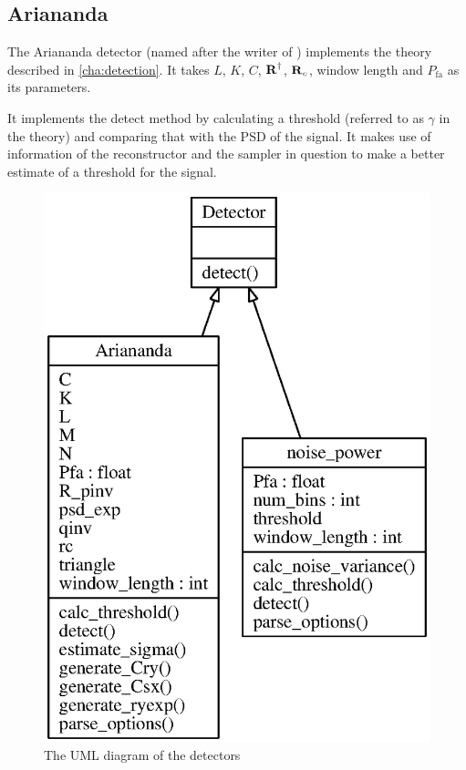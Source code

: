\documentclass[a4paper, openany, oneside]{memoir}
\begin{document}
\subsection{Ariananda}
\label{sub:ariananda}
The Ariananda detector (named after the writer of \cite{ariananda2012compressive}) implements the theory described in \cref{cha:detection}. It takes $L$, $K$, $C$, $\boldsymbol{\mathbf{R}}^\dagger$, $\boldsymbol{\mathbf{R}}_c$, window length and $P_{\text{fa}}$ as its parameters.

It implements the detect method by calculating a threshold (referred to as $\gamma$ in the theory) and comparing that with the PSD of the signal. It makes use of information of the reconstructor and the sampler in question to make a better estimate of a threshold for the signal.


\begin{figure}
    \centering
    \includegraphics[width=0.5\linewidth]{./figures/classes_detection.eps}
    \caption{The UML diagram of the detectors}
    \label{fig:umldetector}
\end{figure}
\end{document}
